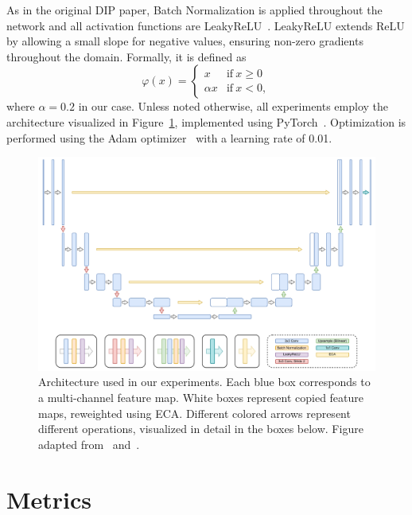 As in the original DIP paper, Batch Normalization is applied throughout the network and all activation functions are LeakyReLU~\cite{LeakyReLU}.
LeakyReLU extends ReLU by allowing a small slope for negative values, ensuring non-zero gradients throughout the domain.
Formally, it is defined as
\begin{equation}
    \varphi(x) = \begin{cases}
        x &\text{if}\ x \geq 0\\
        \alpha x &\text{if}\ x < 0,
    \end{cases}
\end{equation}
where $\alpha = 0.2$ in our case.
Unless noted otherwise, all experiments employ the architecture visualized in Figure~\ref{fig:architecture}, implemented using PyTorch~\cite{PyTorch}.
Optimization is performed using the Adam optimizer~\cite{Adam} with a learning rate of 0.01.

\begin{figure}
    \centering
    \includegraphics[width=\textwidth]{img/fig_5.2.pdf}
    \caption{
        Architecture used in our experiments.
        Each blue box corresponds to a multi-channel feature map.
        White boxes represent copied feature maps, reweighted using ECA\@.
        Different colored arrows represent different operations, visualized in detail in the boxes below.
        Figure adapted from~\cite{U-Net} and~\cite{DIP}.
    }\label{fig:architecture}
\end{figure}

\newpage

\section{Metrics}

